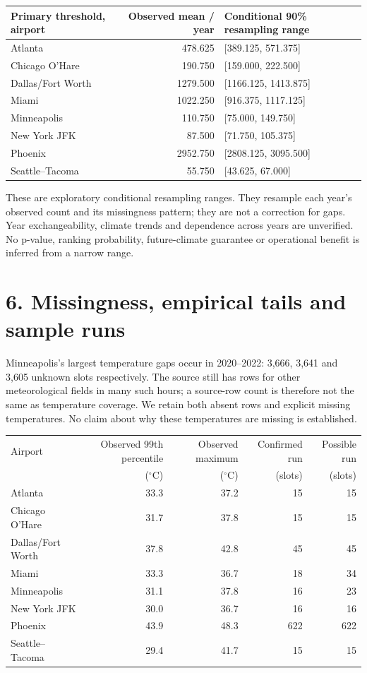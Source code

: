 \documentclass[10pt,letterpaper]{article}
\begin{document}
\begin{center}\small\begin{tabular}{lrl}\toprule
Primary threshold, airport & Observed mean / year & Conditional 90\% resampling range\\\midrule
Atlanta & 478.625 & [389.125, 571.375]\\
Chicago O'Hare & 190.750 & [159.000, 222.500]\\
Dallas/Fort Worth & 1279.500 & [1166.125, 1413.875]\\
Miami & 1022.250 & [916.375, 1117.125]\\
Minneapolis & 110.750 & [75.000, 149.750]\\
New York JFK & 87.500 & [71.750, 105.375]\\
Phoenix & 2952.750 & [2808.125, 3095.500]\\
Seattle--Tacoma & 55.750 & [43.625, 67.000]\\
\bottomrule\end{tabular}\end{center}

These are exploratory conditional resampling ranges. They resample each year's observed count and its missingness pattern; they are not a correction for gaps. Year exchangeability, climate trends and dependence across years are unverified. No p-value, ranking probability, future-climate guarantee or operational benefit is inferred from a narrow range.

\clearpage
\section*{6. Missingness, empirical tails and sample runs}
Minneapolis's largest temperature gaps occur in 2020--2022: 3,666, 3,641 and 3,605 unknown slots respectively. The source still has rows for other meteorological fields in many such hours; a source-row count is therefore not the same as temperature coverage. We retain both absent rows and explicit missing temperatures. No claim about why these temperatures are missing is established.

\begin{center}\small\begin{tabular}{lrrrr}\toprule
Airport & Observed 99th percentile & Observed maximum & Confirmed run & Possible run\\
 & ($^{\circ}$C) & ($^{\circ}$C) & (slots) & (slots)\\\midrule
Atlanta & 33.3 & 37.2 & 15 & 15\\
Chicago O'Hare & 31.7 & 37.8 & 15 & 15\\
Dallas/Fort Worth & 37.8 & 42.8 & 45 & 45\\
Miami & 33.3 & 36.7 & 18 & 34\\
Minneapolis & 31.1 & 37.8 & 16 & 23\\
New York JFK & 30.0 & 36.7 & 16 & 16\\
Phoenix & 43.9 & 48.3 & 622 & 622\\
Seattle--Tacoma & 29.4 & 41.7 & 15 & 15\\
\bottomrule\end{tabular}\end{center}
\end{document}
